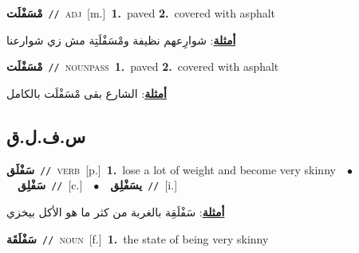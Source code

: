 \documentclass[10pt,a4paper,twoside]{article} %
\begin{document}
\begin{multicols}{2}
{\setlength\topsep{0pt}\textbf{\foreignlanguage{arabic}{مْسَفْلَت}}\ {\color{gray}\texttt{//}\color{black}}\ \textsc{adj}\ [m.]\ \textbf{1.}~paved  \textbf{2.}~covered with asphalt\  \begin{flushright}\color{gray}\foreignlanguage{arabic}{\textbf{\underline{\foreignlanguage{arabic}{أمثلة}}}: شوارِعهم نظيفة ومْسَفْلَتِة مش زي شوارعنا}\end{flushright}\color{black}} \vspace{2mm}

{\setlength\topsep{0pt}\textbf{\foreignlanguage{arabic}{مْسَفْلَت}}\ {\color{gray}\texttt{//}\color{black}}\ \textsc{noun\textunderscore pass}\ \textbf{1.}~paved  \textbf{2.}~covered with asphalt\  \begin{flushright}\color{gray}\foreignlanguage{arabic}{\textbf{\underline{\foreignlanguage{arabic}{أمثلة}}}: الشارع بقى مْسَفْلَت بالكامل}\end{flushright}\color{black}} \vspace{2mm}

\vspace{-3mm}
\subsection*{\color{blue}\foreignlanguage{arabic}{س.ف.ل.ق}\color{blue}{}} 

{\setlength\topsep{0pt}\textbf{\foreignlanguage{arabic}{سَفْلَق}}\ {\color{gray}\texttt{//}\color{black}}\ \textsc{verb}\ [p.]\ \textbf{1.}~lose a lot of weight and become very skinny\ \ $\bullet$\ \ \setlength\topsep{0pt}\textbf{\foreignlanguage{arabic}{سَفْلِق}}\ {\color{gray}\texttt{//}\color{black}}\ [c.]\ \ $\bullet$\ \ \setlength\topsep{0pt}\textbf{\foreignlanguage{arabic}{يسَفْلِق}}\ {\color{gray}\texttt{//}\color{black}}\ [i.]\  \begin{flushright}\color{gray}\foreignlanguage{arabic}{\textbf{\underline{\foreignlanguage{arabic}{أمثلة}}}: سَفْلَقِة بالغربة من كثر ما هو الأكل بيخزي}\end{flushright}\color{black}} \vspace{2mm}

{\setlength\topsep{0pt}\textbf{\foreignlanguage{arabic}{سَفْلَقَة}}\ {\color{gray}\texttt{//}\color{black}}\ \textsc{noun}\ [f.]\ \textbf{1.}~the state of being very skinny\ } \vspace{2mm}


\end{multicols}
\end{document}
